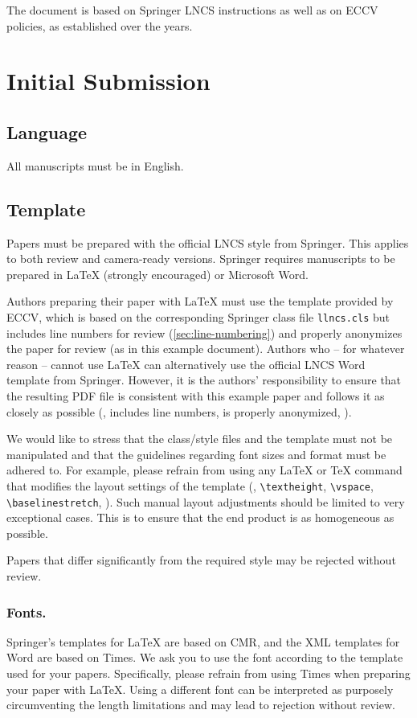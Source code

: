 \documentclass[runningheads]{llncs}
\begin{document}
The document is based on Springer LNCS instructions as well as on ECCV policies, as established over the years.

\section{Initial Submission}

\subsection{Language}
All manuscripts must be in English.


\subsection{Template}
Papers must be prepared with the official LNCS style from Springer.
This applies to both review and camera-ready versions.
Springer requires manuscripts to be prepared in \LaTeX{} (strongly encouraged) or Microsoft Word. 

Authors preparing their paper with \LaTeX{} must use the template provided by ECCV, which is based on the corresponding Springer class file \texttt{llncs.cls} but includes line numbers for review (\cref{sec:line-numbering}) and properly anonymizes the paper for review (as in this example document).
Authors who -- for whatever reason -- cannot use \LaTeX{} can alternatively use the official LNCS Word template from Springer.
However, it is the authors' responsibility to ensure that the resulting PDF file is consistent with this example paper and follows it as closely as possible (\ie, includes line numbers, is properly anonymized, \etc).

We would like to stress that the class/style files and the template must not be manipulated and that the guidelines regarding font sizes and format must be adhered to. 
For example, please refrain from using any \LaTeX{} or \TeX{} command that modifies the layout settings of the template (\eg, \verb+\textheight+, \verb+\vspace+, \verb+\baselinestretch+, \etc).
Such manual layout adjustments should be limited to very exceptional cases.
This is to ensure that the end product is as homogeneous as possible.

Papers that differ significantly from the required style may be rejected without review.


\subsubsection{Fonts.}
Springer's templates for \LaTeX{} are based on CMR, and the XML templates for Word are based on Times. 
We ask you to use the font according to the template used for your papers. 
Specifically, please refrain from using Times when preparing your paper with \LaTeX{}.
Using a different font can be interpreted as purposely circumventing the length limitations and may lead to rejection without review.
\end{document}
